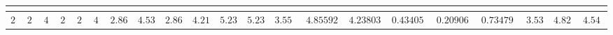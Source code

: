 \begin{table}[!tbp]
\begin{center}
\begin{tabular}{rrrrrrrrrrrrrrrrrrrrr}
\hline\hline
\multicolumn{1}{c}{}&\multicolumn{1}{c}{}&\multicolumn{1}{c}{}&\multicolumn{1}{c}{}&\multicolumn{1}{c}{}&\multicolumn{1}{c}{}&\multicolumn{1}{c}{}&\multicolumn{1}{c}{}&\multicolumn{1}{c}{}&\multicolumn{1}{c}{}&\multicolumn{1}{c}{}&\multicolumn{1}{c}{}&\multicolumn{1}{c}{}&\multicolumn{1}{c}{}&\multicolumn{1}{c}{}&\multicolumn{1}{c}{}&\multicolumn{1}{c}{}&\multicolumn{1}{c}{}&\multicolumn{1}{c}{}&\multicolumn{1}{c}{}&\multicolumn{1}{c}{}\tabularnewline
\hline
$20$&$22$&$42$&$20$&$22$&$42$&$2.861496$&$4.538202$&$2.861496$&$4.217876$&$5.238809$&$5.238809$&$3.55834385$&$4.85592968181818$&$4.23803166666667$&$0.434053641054612$&$0.209066900683418$&$0.734790540428862$&$3.530341$&$4.8228115$&$4.5405735$\tabularnewline
\hline
\end{tabular}\end{center}
\end{table}
